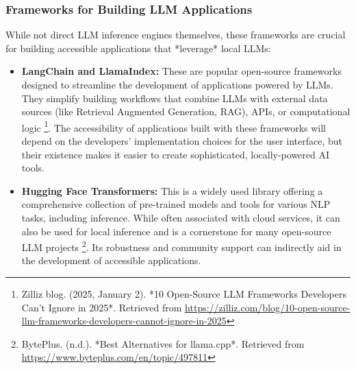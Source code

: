 \subsubsection{Frameworks for Building LLM Applications}
While not direct LLM inference engines themselves, these frameworks are crucial for building accessible applications that *leverage* local LLMs:
\begin{itemize}
    \item \textbf{LangChain and LlamaIndex:} These are popular open-source frameworks designed to streamline the development of applications powered by LLMs. They simplify building workflows that combine LLMs with external data sources (like Retrieval Augmented Generation, RAG), APIs, or computational logic \footnote{Zilliz blog. (2025, January 2). *10 Open-Source LLM Frameworks Developers Can't Ignore in 2025*. Retrieved from \url{https://zilliz.com/blog/10-open-source-llm-frameworks-developers-cannot-ignore-in-2025}}. The accessibility of applications built with these frameworks will depend on the developers' implementation choices for the user interface, but their existence makes it easier to create sophisticated, locally-powered AI tools.
    \item \textbf{Hugging Face Transformers:} This is a widely used library offering a comprehensive collection of pre-trained models and tools for various NLP tasks, including inference. While often associated with cloud services, it can also be used for local inference and is a cornerstone for many open-source LLM projects \footnote{BytePlus. (n.d.). *Best Alternatives for llama.cpp*. Retrieved from \url{https://www.byteplus.com/en/topic/497811}}. Its robustness and community support can indirectly aid in the development of accessible applications.
\end{itemize}


